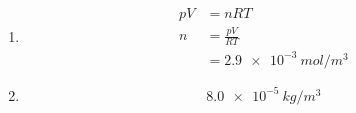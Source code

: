 \documentclass{article}
\begin{document}
\subsubsection{}

\begin{enumerate}
  \item

        \begin{align*}
          p V & = n R T                 \\
          n   & = \frac{p V}{R T}       \\
              & = \qty{2.9e-3}{mol/m^3}
        \end{align*}

  \item \[\qty{8.0e-5}{kg/m^3}\]
\end{enumerate}

\subsubsection{}
\end{document}
